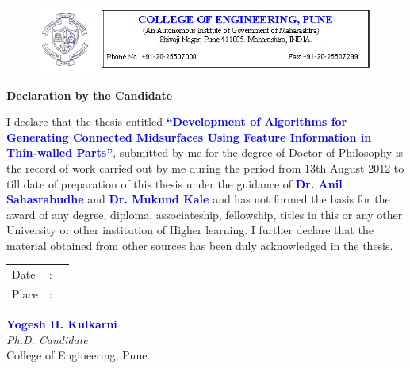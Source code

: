 \begin{figure} [!h]
	\centering
	\includegraphics[width=\linewidth]{images/coep_header.png}
\end{figure}

\vspace*{50pt}

\begin{center}{\Huge \textbf{Declaration by the Candidate}}\end{center}

\vspace*{20pt}

\begin{flushleft}
I declare that the thesis entitled \textcolor{blue}{\textbf{``Development of Algorithms for Generating Connected Midsurfaces Using Feature Information in Thin-walled Parts''}}, submitted by me for the degree of Doctor of Philosophy is the record of work carried out by me during the period from 13th August 2012 to till date of preparation of this thesis under the guidance of \textcolor{blue}{\textbf{Dr. Anil Sahasrabudhe}} and \textcolor{blue}{\textbf{Dr. Mukund Kale}} and has not formed the basis for the award of any degree, diploma, associateship, fellowship, titles in this or any other University or other institution of Higher learning.
I further declare that the material obtained from other sources has been duly acknowledged in the thesis.

\end{flushleft}

\vspace*{120pt}

\begin{minipage}[t]{0.5\textwidth}%
\begin{tabular}{lcl}
Date & : &  \tabularnewline
Place &: &  \tabularnewline
\end{tabular}%
\end{minipage}\hspace{0.5cm}
\begin{minipage}[t]{0.4\textwidth}%
\begin{flushleft}
 {
\textcolor{blue}{\textbf{Yogesh H. Kulkarni}}\\
\emph{Ph.D. Candidate}}\\
College of Engineering, Pune.
\end{flushleft}

\end{minipage}
